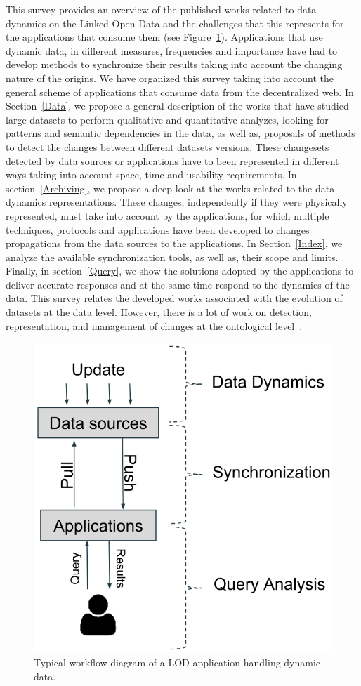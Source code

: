 \documentclass[sw]{iosart2x}
\begin{document}
This survey provides an overview of the published works related to data dynamics on the Linked Open Data and the challenges that this represents for the applications that consume them (see Figure~\ref{fig:pic}). Applications that use dynamic data, in different measures, frequencies and importance have had to develop methods to synchronize their results taking into account the changing nature of the origins. We have organized this survey taking into account the general scheme of applications that consume data from the decentralized web. In Section~\ref{Data}, we propose a general description of the works that have studied large datasets to perform qualitative and quantitative analyzes, looking for patterns and semantic dependencies in the data, as well as, proposals of methods to detect the changes between different datasets versions. These changesets  detected by data sources or applications have to been represented in different ways taking into account space, time and usability requirements. In section~\ref{Archiving}, we propose a deep look at the works related to the data dynamics representations. These changes, independently if they were physically represented, must take into account by the applications, for which multiple techniques, protocols and applications have been developed to changes propagations from the data sources to the applications. In Section~\ref{Index}, we analyze the available synchronization tools, as well as, their scope and limits. Finally, in section~\ref{Query}, we show the solutions adopted by the applications to deliver accurate responses and at the same time respond to the dynamics of the data. This survey relates the developed works associated with the evolution of datasets at the data level. However, there is a lot of work on detection, representation, and management of changes at the ontological level~\cite{ZablithAdFKMPS15}.

\begin{figure}[h]
	\centering
	\includegraphics[width=0.9\linewidth]{img/pic}
	\caption{Typical workflow diagram of a LOD application handling dynamic data.}
	\label{fig:pic}
\end{figure}
\end{document}
